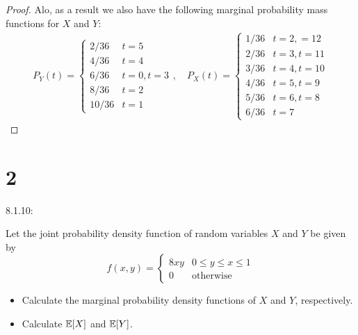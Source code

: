 \documentclass{article}
\begin{document}
\begin{proof}
    Alo, as a result we also have the following marginal probability mass functions for $X$ and $Y$:
    \begin{align}
        P_Y(t) = \begin{cases}
            2/36 & t=5\\
            4/36 & t=4\\
            6/36 & t=0,t=3\\
            8/36 & t=2\\
            10/36 & t=1
        \end{cases}, \quad P_X(t) = \begin{cases}
            1/36 & t=2,=12\\
            2/36 & t=3,t=11\\
            3/36 & t=4,t=10\\
            4/36 & t=5,t=9\\
            5/36 & t=6,t=8\\
            6/36 & t=7
        \end{cases}
    \end{align}
\end{proof}

\hfil

\section*{2}
\begin{ques}\label{q2}
    8.1.10:

    Let the joint probability density function of random variables $X$ and $Y$ be given by 
    $$f(x,y) = \begin{cases}
        8xy & 0\leq y\leq x\leq 1\\
        0 & \text{otherwise}
    \end{cases}$$
    \begin{itemize}
        \item[(a)] Calculate the marginal probability density functions of $X$ and $Y$, respectively.
        \item[(b)] Calculate $\mathbb{E}[X]$ and $\mathbb{E}[Y]$. 
    \end{itemize}
\end{ques}
\end{document}
